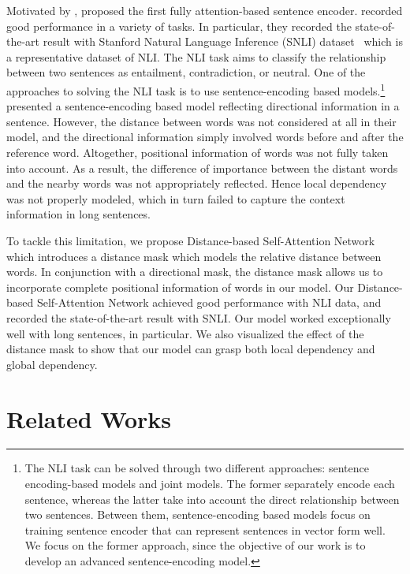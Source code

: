 \documentclass[11pt,letterpaper]{article}
\begin{document}
Motivated by \citet{AttentionAYN}, \citet{DiSAN} proposed the first fully attention-based sentence encoder. \citet{DiSAN} recorded good performance in a variety of tasks. In particular, they recorded the state-of-the-art result with Stanford Natural Language Inference (SNLI) dataset~\citep{SNLI} which is a representative dataset of NLI. The NLI task aims to classify the relationship between two sentences as entailment, contradiction, or neutral. One of the approaches to solving the NLI task is to use sentence-encoding based models.\footnote[1]{The NLI task can be solved through two different approaches: sentence encoding-based models and joint models. The former separately encode each sentence, whereas the latter take into account the direct relationship between two sentences. Between them, sentence-encoding based models focus on training sentence encoder that can represent sentences in vector form well. We focus on the former approach, since the objective of our work is to develop an advanced sentence-encoding model.} \citet{DiSAN} presented a sentence-encoding based model reflecting directional information in a sentence. However, the distance between words was not considered at all in their model, and the directional information simply involved words before and after the reference word. Altogether, positional information of words was not fully taken into account. As a result, the difference of importance between the distant words and the nearby words was not appropriately reflected. Hence local dependency was not properly modeled, which in turn failed to capture the context information in long sentences.

To tackle this limitation, we propose Distance-based Self-Attention Network which introduces a distance mask which models the relative distance between words. In conjunction with a directional mask, the distance mask allows us to incorporate complete positional information of words in our model. Our Distance-based Self-Attention Network achieved good performance with NLI data, and recorded the state-of-the-art result with SNLI. Our model worked exceptionally well with long sentences, in particular. We also visualized the effect of the distance mask to show that our model can grasp both local dependency and global dependency. 



\section{Related Works}
\label{2}
\end{document}
